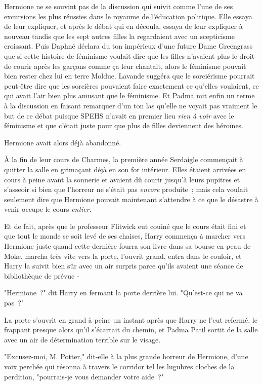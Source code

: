 Hermione ne se souvint pas de la discussion qui suivit comme l'une de ses excursions les plus réussies dans le royaume de l'éducation politique. Elle essaya de leur expliquer, et après le débat qui en découla, essaya de leur expliquer à nouveau tandis que les sept autres filles la regardaient avec un scepticisme croissant. Puis Daphné déclara du ton impérieux d'une future Dame Greengrass que si cette histoire de féminisme voulait dire que les filles n'avaient plus le droit de courir après les garçons comme ça leur chantait, alors le féminisme pouvait bien rester chez lui en terre Moldue. Lavande suggéra que le sorciérisme pourrait peut-être dire que les sorcières pouvaient faire exactement ce qu'elles voulaient, ce qui avait l'air bien plus amusant que le féminisme. Et Padma mit enfin un terme à la discussion en faisant remarquer d'un ton las qu'elle ne voyait pas vraiment le but de ce débat puisque SPEHS n'avait en premier lieu \emph{rien à voir} avec le féminisme et que c'était juste pour que plus de filles deviennent des héroïnes.

Hermione avait alors déjà abandonné.

\later

À la fin de leur cours de Charmes, la première année Serdaigle commençait à quitter la salle en grimaçant déjà en son for intérieur. Elles étaient arrivées en cours à peine avant la sonnerie et avaient dû courir jusqu'à leurs pupitres et s'asseoir si bien que l'horreur ne s'était pas \emph{encore} produite~; mais cela voulait seulement dire que Hermione pouvait maintenant s'attendre à ce que le désastre à venir occupe le cours \emph{entier}.

Et de fait, après que le professeur Flitwick eut couiné que le cours était fini et que tout le monde se soit levé de ses chaises, Harry commença à marcher vers Hermione juste quand cette dernière fourra son livre dans sa bourse en peau de Moke, marcha très vite vers la porte, l'ouvrit grand, entra dans le couloir, et Harry la suivit bien sûr avec un air surpris parce qu'ils avaient une séance de bibliothèque de prévue -

"Hermione~?" dit Harry en fermant la porte derrière lui. "Qu'est-ce qui ne va pas~?"

La porte s'ouvrit en grand à peine un instant après que Harry ne l'eut refermé, le frappant presque alors qu'il s'écartait du chemin, et Padma Patil sortit de la salle avec un air de détermination terrible sur le visage.

"Excusez-moi, M. Potter," dit-elle à la plus grande horreur de Hermione, d'une voix perchée qui résonna à travers le corridor tel les lugubres cloches de la perdition, "pourrais-je vous demander votre aide~?"

